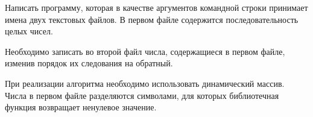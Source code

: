 

Написать программу, которая в качестве аргументов командной строки
принимает имена двух текстовых файлов.
В первом файле содержится
последовательность целых чисел.

Необходимо записать во второй файл
числа, содержащиеся в первом файле, изменив порядок их следования на
обратный.

При реализации алгоритма необходимо использовать
динамический массив. Числа в первом файле разделяются символами, для
которых библиотечная функция  возвращает ненулевое значение.
